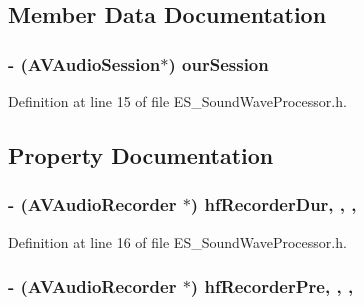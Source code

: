 \subsection{Member Data Documentation}
\hypertarget{interface_e_s___sound_wave_processor_a029e97ffd5fcd9fe9c92e8e661dce50a}{
\subsubsection[{our\+Session}]{\setlength{\rightskip}{0pt plus 5cm}-\/ (A\+V\+Audio\+Session$\ast$) our\+Session\hspace{0.3cm}{\ttfamily [protected]}}}\label{interface_e_s___sound_wave_processor_a029e97ffd5fcd9fe9c92e8e661dce50a}


Definition at line 15 of file E\+S\+\_\+\+Sound\+Wave\+Processor.\+h.



\subsection{Property Documentation}
\hypertarget{interface_e_s___sound_wave_processor_a2400b027a3620b00f5acd052ab017f2c}{
\subsubsection[{hf\+Recorder\+Dur}]{\setlength{\rightskip}{0pt plus 5cm}-\/ (A\+V\+Audio\+Recorder $\ast$) hf\+Recorder\+Dur\hspace{0.3cm}{\ttfamily [read]}, {\ttfamily [write]}, {\ttfamily [nonatomic]}, {\ttfamily [retain]}}}\label{interface_e_s___sound_wave_processor_a2400b027a3620b00f5acd052ab017f2c}


Definition at line 16 of file E\+S\+\_\+\+Sound\+Wave\+Processor.\+h.

\hypertarget{interface_e_s___sound_wave_processor_a51e8dbca07474e0a33c8271d609755d9}{
\subsubsection[{hf\+Recorder\+Pre}]{\setlength{\rightskip}{0pt plus 5cm}-\/ (A\+V\+Audio\+Recorder $\ast$) hf\+Recorder\+Pre\hspace{0.3cm}{\ttfamily [read]}, {\ttfamily [write]}, {\ttfamily [nonatomic]}, {\ttfamily [retain]}}}\label{interface_e_s___sound_wave_processor_a51e8dbca07474e0a33c8271d609755d9}


